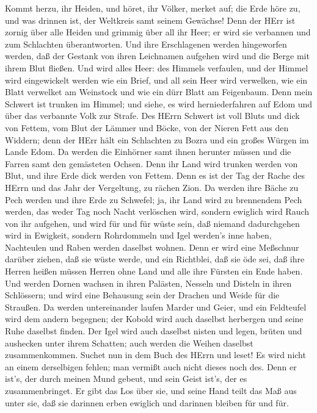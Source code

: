  Kommt herzu, ihr Heiden, und höret, ihr Völker, merket auf;
die Erde höre zu, und was drinnen ist, der Weltkreis samt seinem
Gewächse!  Denn der HErr ist zornig über alle Heiden und
grimmig über all ihr Heer; er wird sie verbannen und zum Schlachten
überantworten.  Und ihre Erschlagenen werden hingeworfen
werden, daß der Gestank von ihren Leichnamen aufgehen wird und die Berge
mit ihrem Blut fließen.  Und wird alles Heer: des Himmels
verfaulen, und der Himmel wird eingewickelt werden wie ein Brief, und
all sein Heer wird verwelken, wie ein Blatt verwelket am Weinstock und
wie ein dürr Blatt am Feigenbaum.  Denn mein Schwert ist
trunken im Himmel; und siehe, es wird herniederfahren auf Edom und über
das verbannte Volk zur Strafe.  Des HErrn Schwert ist voll
Bluts und dick von Fettem, vom Blut der Lämmer und Böcke, von der Nieren
Fett aus den Widdern; denn der HErr hält ein Schlachten zu Bozra und ein
großes Würgen im Lande Edom.  Da werden die Einhörner samt
ihnen herunter müssen und die Farren samt den gemästeten Ochsen. Denn
ihr Land wird trunken werden von Blut, und ihre Erde dick werden von
Fettem.  Denn es ist der Tag der Rache des HErrn und das
Jahr der Vergeltung, zu rächen Zion.  Da werden ihre Bäche
zu Pech werden und ihre Erde zu Schwefel; ja, ihr Land wird zu
brennendem Pech werden,  das weder Tag noch Nacht
verlöschen wird, sondern ewiglich wird Rauch von ihr aufgehen, und wird
für und für wüste sein, daß niemand dadurchgehen wird in Ewigkeit,
 sondern Rohrdommeln und Igel werden's inne haben,
Nachteulen und Raben werden daselbst wohnen. Denn er wird eine Meßschnur
darüber ziehen, daß sie wüste werde, und ein Richtblei, daß sie öde sei,
 daß ihre Herren heißen müssen Herren ohne Land und alle
ihre Fürsten ein Ende haben.  Und werden Dornen wachsen in
ihren Palästen, Nesseln und Disteln in ihren Schlössern; und wird eine
Behausung sein der Drachen und Weide für die Straußen.  Da
werden untereinander laufen Marder und Geier, und ein Feldteufel wird
dem andern begegnen; der Kobold wird auch daselbst herbergen und seine
Ruhe daselbst finden.  Der Igel wird auch daselbst nisten
und legen, brüten und aushecken unter ihrem Schatten; auch werden die
Weihen daselbst zusammenkommen.  Suchet nun in dem Buch des
HErrn und leset! Es wird nicht an einem derselbigen fehlen; man vermißt
auch nicht dieses noch des. Denn er ist's, der durch meinen Mund gebeut,
und sein Geist ist's, der es zusammenbringet.  Er gibt das
Los über sie, und seine Hand teilt das Maß aus unter sie, daß sie
darinnen erben ewiglich und darinnen bleiben für und für.

